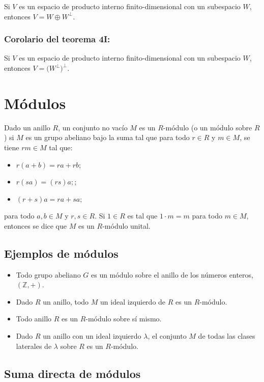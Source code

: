 \documentclass{article}
\begin{document}
Si $V$ es un espacio de producto interno finito-dimensional con un subespacio $W$, entonces $V=W\oplus W^{\perp}$.

\subsubsection*{\color{red} Corolario del teorema 4I:}

Si $V$ es un espacio de producto interno finito-dimensional con un subespacio $W$, entonces $V=\big(W^{\perp}\big)^{\perp}$.

\newpage

\section{Módulos}

Dado un anillo $R$, un conjunto no vacío $M$ es un $R$-módulo (o un módulo sobre $R$) si $M$ es un grupo abeliano bajo la suma tal que para todo $r\in R$ y $m\in M$, se tiene $rm\in M$ tal que:

\begin{itemize}
\item $r(a+b)=ra+rb$;
\item $r(sa)=(rs)a;$;
\item $(r+s)a=ra+sa$;
\end{itemize}
para todo $a,b\in M$ y $r,s\in R$. Si $1\in R$ es tal que $1\cdot m=m$ para todo $m\in M$, entonces se dice que $M$ es un $R$-módulo unital.

\subsection*{\color{teal} Ejemplos de módulos}

\begin{itemize}
\item Todo grupo abeliano $G$ es un módulo sobre el anillo de los números enteros, $(\mathbb{Z},+)$.
\item Dado $R$ un anillo, todo $M$ un ideal izquierdo de $R$ es un $R$-módulo.
\item Todo anillo $R$ es un $R$-módulo sobre sí mismo.
\item Dado $R$ un anillo con un ideal izquierdo $\lambda$, el conjunto $M$ de todas las clases laterales de $\lambda$ sobre $R$ es un $R$-módulo.
\end{itemize}

\subsection*{\color{violet} Suma directa de módulos}
\end{document}
